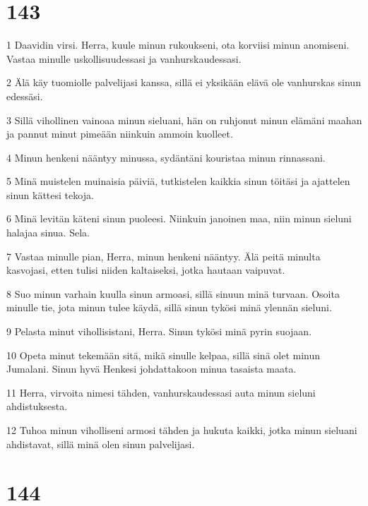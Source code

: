 \chapter{143}

\par 1 Daavidin virsi. Herra, kuule minun rukoukseni, ota korviisi minun anomiseni. Vastaa minulle uskollisuudessasi ja vanhurskaudessasi.
\par 2 Älä käy tuomiolle palvelijasi kanssa, sillä ei yksikään elävä ole vanhurskas sinun edessäsi.
\par 3 Sillä vihollinen vainoaa minun sieluani, hän on ruhjonut minun elämäni maahan ja pannut minut pimeään niinkuin ammoin kuolleet.
\par 4 Minun henkeni nääntyy minussa, sydäntäni kouristaa minun rinnassani.
\par 5 Minä muistelen muinaisia päiviä, tutkistelen kaikkia sinun töitäsi ja ajattelen sinun kättesi tekoja.
\par 6 Minä levitän käteni sinun puoleesi. Niinkuin janoinen maa, niin minun sieluni halajaa sinua. Sela.
\par 7 Vastaa minulle pian, Herra, minun henkeni nääntyy. Älä peitä minulta kasvojasi, etten tulisi niiden kaltaiseksi, jotka hautaan vaipuvat.
\par 8 Suo minun varhain kuulla sinun armoasi, sillä sinuun minä turvaan. Osoita minulle tie, jota minun tulee käydä, sillä sinun tykösi minä ylennän sieluni.
\par 9 Pelasta minut vihollisistani, Herra. Sinun tykösi minä pyrin suojaan.
\par 10 Opeta minut tekemään sitä, mikä sinulle kelpaa, sillä sinä olet minun Jumalani. Sinun hyvä Henkesi johdattakoon minua tasaista maata.
\par 11 Herra, virvoita nimesi tähden, vanhurskaudessasi auta minun sieluni ahdistuksesta.
\par 12 Tuhoa minun viholliseni armosi tähden ja hukuta kaikki, jotka minun sieluani ahdistavat, sillä minä olen sinun palvelijasi.

\chapter{144}

